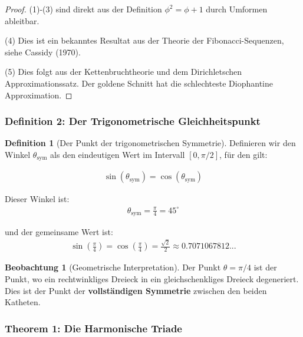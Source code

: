 \documentclass[a4paper,12pt,twoside]{report}
\theoremstyle{definition}
\newtheorem{definition}{Definition}
\newtheorem{beobachtung}{Beobachtung}
\begin{document}
\begin{proof}
(1)-(3) sind direkt aus der Definition $\phi^2 = \phi + 1$ durch Umformen ableitbar.

(4) Dies ist ein bekanntes Resultat aus der Theorie der Fibonacci-Sequenzen, siehe Cassidy (1970).

(5) Dies folgt aus der Kettenbruchtheorie und dem Dirichletschen Approximationssatz. Der goldene Schnitt hat die schlechteste Diophantine Approximation.
\end{proof}

\subsubsection{Definition 2: Der Trigonometrische Gleichheitspunkt}

\begin{definition}[Der Punkt der trigonometrischen Symmetrie]
Definieren wir den Winkel $\theta_{\text{sym}}$ als den eindeutigen Wert im Intervall $[0, \pi/2]$, für den gilt:

\begin{align}
\sin(\theta_{\text{sym}}) = \cos(\theta_{\text{sym}})
\end{align}

Dieser Winkel ist:
\begin{align}
\theta_{\text{sym}} = \frac{\pi}{4} = 45^\circ
\end{align}

und der gemeinsame Wert ist:
\begin{align}
\sin\left(\frac{\pi}{4}\right) = \cos\left(\frac{\pi}{4}\right) = \frac{\sqrt{2}}{2} \approx 0.7071067812...
\end{align}
\end{definition}

\begin{beobachtung}[Geometrische Interpretation]
Der Punkt $\theta = \pi/4$ ist der Punkt, wo ein rechtwinkliges Dreieck in ein gleichschenkliges Dreieck degeneriert. Dies ist der Punkt der \textbf{vollständigen Symmetrie} zwischen den beiden Katheten.
\end{beobachtung}

\subsubsection*{Theorem 1: Die Harmonische Triade}
\end{document}
